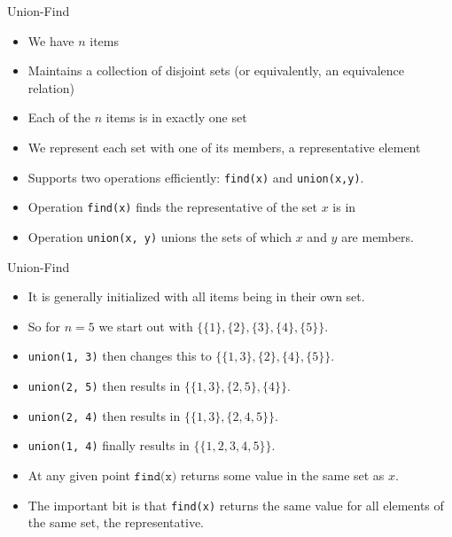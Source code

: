 \documentclass{beamer}
\begin{document}
\begin{frame}[plain]{Union-Find}
    \begin{itemize}
        \item<1-> We have $n$ items
        \item<2-> Maintains a collection of disjoint sets (or equivalently, an equivalence relation)
        \item<3-> Each of the $n$ items is in exactly one set
        \item<4-> We represent each set with one of its members, a representative element
        \item<5-> Supports two operations efficiently: \texttt{find(x)} and \texttt{union(x,y)}.
        \item<6-> Operation \texttt{find(x)} finds the representative of the set $x$ is in
        \item<7-> Operation \texttt{union(x, y)} unions the sets of which $x$ and $y$ are members.
    \end{itemize}
\end{frame}

\begin{frame}[plain]{Union-Find}
    \begin{itemize}
        \item<1-> It is generally initialized with all items being in their own set.
        \item<2-> So for $n = 5$ we start out with $\{\{1\},\{2\},\{3\},\{4\},\{5\}\}$.
        \item<3-> \texttt{union(1, 3)} then changes this to $\{\{1, 3\}, \{2\}, \{4\}, \{5\}\}$.
		\item<4-> \texttt{union(2, 5)} then results in $\{\{1, 3\}, \{2, 5\}, \{4\}\}$.
		\item<5-> \texttt{union(2, 4)} then results in $\{\{1, 3\}, \{2, 4, 5\}\}$.
		\item<6-> \texttt{union(1, 4)} finally results in $\{\{1, 2, 3, 4, 5\}\}$.
        \item<7-> At any given point $\texttt{find(x)}$ returns some value in the same set as $x$.
        \item<8-> The important bit is that \texttt{find(x)} returns the same value for all elements of the same set, the representative.
    \end{itemize}
\end{frame}
\end{document}
